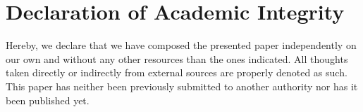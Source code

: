 \section{Declaration of Academic Integrity}
Hereby, we declare that we have composed the presented paper independently on our own and without any other resources than the ones indicated. All thoughts taken directly or indirectly from external sources are properly denoted as such. This paper has neither been previously submitted to another authority nor has it been published yet.
\vspace{0.3in}

